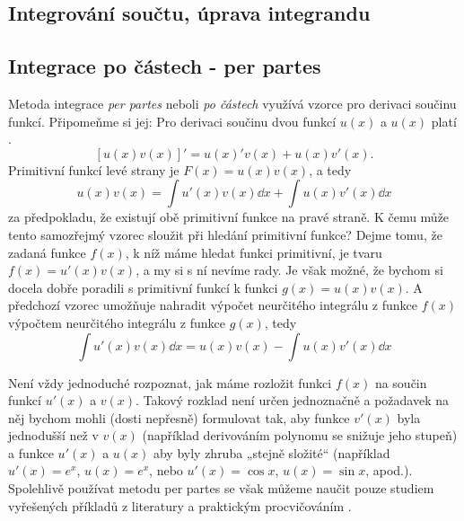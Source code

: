     \subsection{Integrování součtu, úprava integrandu}  
      
    \subsection{Integrace po částech - per partes}
      Metoda integrace \emph{per partes} neboli \emph{po částech} využívá vzorce pro derivaci 
      součinu funkcí. Připomeňme si jej: Pro derivaci součinu dvou funkcí \(u(x)\) a \(u(x)\) platí
      \cite[p.~137]{Musilova2009MA1}.
      \begin{equation}\label{mai:eq101}
        [u(x)v(x)]' = u(x)'v(x) + u(x)v'(x).
      \end{equation} 
      Primitivní funkcí levé strany je \(F(x) = u(x)v(x)\), a tedy
      \begin{equation*}
        u(x)v(x) =  \int u'(x)v(x)\dd{x} + \int u(x)v'(x)\dd{x}
      \end{equation*}  
      za předpokladu, že existují obě primitivní funkce na pravé straně. K čemu může tento
      samozřejmý vzorec sloužit při hledání primitivní funkce? Dejme tomu, že zadaná funkce
      \(f(x)\), k níž máme hledat funkci primitivní, je tvaru \(f(x) = u'(x)v(x)\), a my si s ní
      nevíme rady. Je však možné, že bychom si docela dobře poradili s primitivní funkcí k funkci
      \(g(x) = u(x)v(x)\). A předchozí vzorec umožňuje nahradit výpočet neurčitého integrálu z
      funkce \(f(x)\) výpočtem neurčitého integrálu z funkce \(g(x)\), tedy
      \begin{equation}\label{ma:eq_perpartes}
        \int u'(x)v(x)\dd{x} = u(x)v(x) - \int u(x)v'(x)\dd{x} 
      \end{equation}

      

      Není vždy jednoduché rozpoznat, jak máme rozložit funkci \(f(x)\) na součin funkcí \(u'(x)\) 
      a \(v(x)\). Takový rozklad není určen jednoznačně a požadavek na něj bychom mohli (dosti 
      nepřesně) formulovat tak, aby funkce \(v'(x)\) byla jednodušší než v \(v(x)\) (například 
      derivováním polynomu se snižuje jeho stupeň) a funkce \(u'(x)\) a \(u(x)\) aby byly zhruba 
      „stejně složité“ (například \(u'(x) =e^x\), \(u(x) = e^x\), nebo \(u'(x) = \cos x\), \(u(x) = 
      \sin x\), apod.). Spolehlivě používat metodu per partes se však můžeme naučit pouze studiem 
      vyřešených příkladů z literatury a praktickým procvičováním \cite[p.~138]{Musilova2009MA1}.
  

